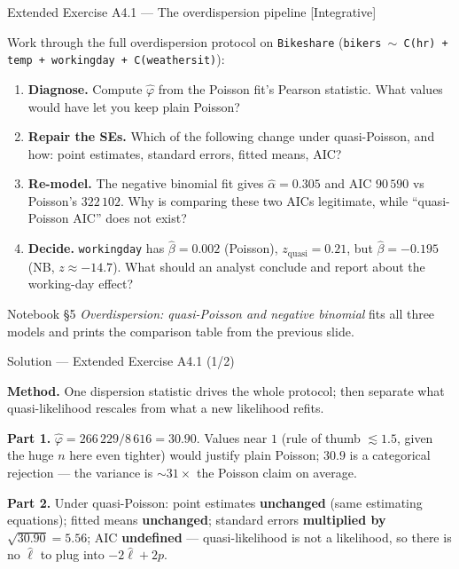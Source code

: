 \documentclass[aspectratio=169,11pt]{beamer}
\begin{document}
\begin{frame}{Extended Exercise A4.1 --- The overdispersion pipeline [Integrative]}
\begin{longexercise}
  Work through the full overdispersion protocol on \texttt{Bikeshare}
  (\texttt{bikers $\sim$ C(hr) + temp + workingday + C(weathersit)}):
  \begin{enumerate}
    \item \textbf{Diagnose.} Compute $\hat\varphi$ from the Poisson fit's Pearson
          statistic. What values would have let you keep plain Poisson?
    \item \textbf{Repair the SEs.} Which of the following change under quasi-Poisson,
          and how: point estimates, standard errors, fitted means, AIC?
    \item \textbf{Re-model.} The negative binomial fit gives $\hat\alpha = 0.305$ and
          AIC $90\,590$ vs Poisson's $322\,102$. Why is comparing these two AICs
          legitimate, while ``quasi-Poisson AIC'' does not exist?
    \item \textbf{Decide.} \texttt{workingday} has $\hat\beta = 0.002$ (Poisson),
          $z_{\text{quasi}} = 0.21$, but $\hat\beta = -0.195$ (NB, $z \approx -14.7$).
          What should an analyst conclude and report about the working-day effect?
  \end{enumerate}
\end{longexercise}
\begin{labnote}
  Notebook \S 5 \emph{Overdispersion: quasi-Poisson and negative binomial} fits all
  three models and prints the comparison table from the previous slide.
\end{labnote}
\end{frame}

\begin{frame}{Solution --- Extended Exercise A4.1 (1/2)}
\begin{solutionbox}
  \textbf{Method.} One dispersion statistic drives the whole protocol; then separate
  what quasi-likelihood rescales from what a new likelihood refits.

  \textbf{Part 1.} $\hat\varphi = 266\,229/8\,616 = 30.90$. Values near $1$
  (rule of thumb $\lesssim 1.5$, given the huge $n$ here even tighter) would justify
  plain Poisson; $30.9$ is a categorical rejection --- the variance is
  $\sim\!31\times$ the Poisson claim on average.

  \textbf{Part 2.} Under quasi-Poisson: point estimates \textbf{unchanged} (same
  estimating equations); fitted means \textbf{unchanged}; standard errors
  \textbf{multiplied by} $\sqrt{30.90}=5.56$; AIC \textbf{undefined} ---
  quasi-likelihood is not a likelihood, so there is no $\hat\ell$ to plug into
  $-2\hat\ell + 2p$.
\end{solutionbox}
\end{frame}
\end{document}
